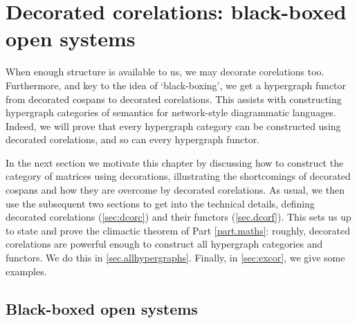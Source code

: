 \chapter{Decorated corelations: black-boxed open systems} \label{ch.deccorels}

When enough structure is available to us, we may decorate corelations too.
Furthermore, and key to the idea of `black-boxing', we get a hypergraph functor
from decorated cospans to decorated corelations. This assists with constructing
hypergraph categories of semantics for network-style diagrammatic languages.
Indeed, we will prove that every hypergraph category can be constructed using
decorated corelations, and so can every hypergraph functor.

In the next section we motivate this chapter by discussing how to construct the
category of matrices using decorations, illustrating the shortcomings of
decorated cospans and how they are overcome by decorated corelations. As usual,
we then use the subsequent two sections to get into the technical details,
defining decorated corelations (\textsection\ref{sec:dcorc}) and their functors
(\textsection\ref{sec.dcorf}). This sets us up to state and prove the climactic
theorem of Part \ref{part.maths}: roughly, decorated corelations are powerful
enough to construct all hypergraph categories and functors. We do this in
\textsection\ref{sec.allhypergraphs}. Finally, in \textsection\ref{sec:excor},
we give some examples.

\section{Black-boxed open systems} \label{sec.blackboxedsystems}

